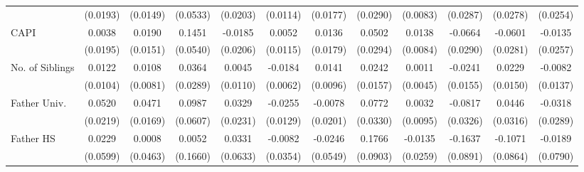 \begin{table}[htbp]
\begin{tabular}{l*{11}{c}}
            &    (0.0193)         &    (0.0149)         &    (0.0533)         &    (0.0203)         &    (0.0114)         &    (0.0177)         &    (0.0290)         &    (0.0083)         &    (0.0287)         &    (0.0278)         &    (0.0254)         \\
\addlinespace
CAPI        &      0.0038         &      0.0190         &      0.1451\sym{**} &     -0.0185         &      0.0052         &      0.0136         &      0.0502         &      0.0138         &     -0.0664\sym{*}  &     -0.0601\sym{*}  &     -0.0135         \\
            &    (0.0195)         &    (0.0151)         &    (0.0540)         &    (0.0206)         &    (0.0115)         &    (0.0179)         &    (0.0294)         &    (0.0084)         &    (0.0290)         &    (0.0281)         &    (0.0257)         \\
\addlinespace
No. of Siblings&      0.0122         &      0.0108         &      0.0364         &      0.0045         &     -0.0184\sym{**} &      0.0141         &      0.0242         &      0.0011         &     -0.0241         &      0.0229         &     -0.0082         \\
            &    (0.0104)         &    (0.0081)         &    (0.0289)         &    (0.0110)         &    (0.0062)         &    (0.0096)         &    (0.0157)         &    (0.0045)         &    (0.0155)         &    (0.0150)         &    (0.0137)         \\
\addlinespace
Father Univ.&      0.0520\sym{*}  &      0.0471\sym{**} &      0.0987         &      0.0329         &     -0.0255\sym{*}  &     -0.0078         &      0.0772\sym{*}  &      0.0032         &     -0.0817\sym{*}  &      0.0446         &     -0.0318         \\
            &    (0.0219)         &    (0.0169)         &    (0.0607)         &    (0.0231)         &    (0.0129)         &    (0.0201)         &    (0.0330)         &    (0.0095)         &    (0.0326)         &    (0.0316)         &    (0.0289)         \\
\addlinespace
Father HS   &      0.0229         &      0.0008         &      0.0052         &      0.0331         &     -0.0082         &     -0.0246         &      0.1766         &     -0.0135         &     -0.1637         &     -0.1071         &     -0.0189         \\
            &    (0.0599)         &    (0.0463)         &    (0.1660)         &    (0.0633)         &    (0.0354)         &    (0.0549)         &    (0.0903)         &    (0.0259)         &    (0.0891)         &    (0.0864)         &    (0.0790)         \\

\end{tabular}
\end{table}
